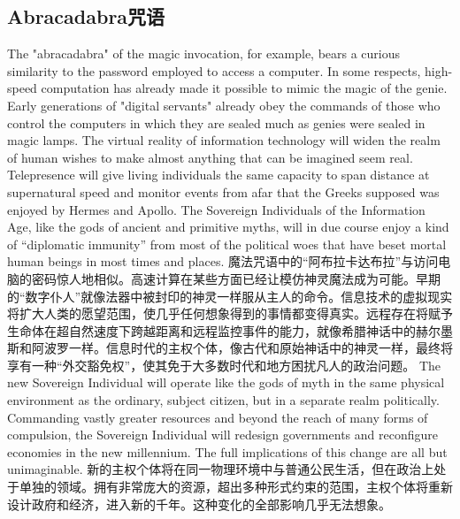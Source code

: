 \subsection{Abracadabra咒语}
\begin{paracol}{2}[]
The "abracadabra" of the magic invocation, for example, bears a curious similarity to the password employed to access a computer. In some respects, high-speed computation has already made it possible to mimic the magic of the genie. Early generations of "digital servants" already obey the commands of those who control the computers in which they are sealed much as genies were sealed in magic lamps. The virtual reality of information technology will widen the realm of human wishes to make almost anything that can be imagined seem real. Telepresence will give living individuals the same capacity to span distance at supernatural speed and monitor events from afar that the Greeks supposed was enjoyed by Hermes and Apollo. The Sovereign Individuals of the Information Age, like the gods of ancient and primitive myths, will in due course enjoy a kind of ``diplomatic immunity'' from most of the political woes that have beset mortal human beings in most times and places.
\switchcolumn
魔法咒语中的“阿布拉卡达布拉”与访问电脑的密码惊人地相似。高速计算在某些方面已经让模仿神灵魔法成为可能。早期的“数字仆人”就像法器中被封印的神灵一样服从主人的命令。信息技术的虚拟现实将扩大人类的愿望范围，使几乎任何想象得到的事情都变得真实。远程存在将赋予生命体在超自然速度下跨越距离和远程监控事件的能力，就像希腊神话中的赫尔墨斯和阿波罗一样。信息时代的主权个体，像古代和原始神话中的神灵一样，最终将享有一种“外交豁免权”，使其免于大多数时代和地方困扰凡人的政治问题。
\switchcolumn*
The new Sovereign Individual will operate like the gods of myth in the same physical environment as the ordinary, subject citizen, but in a separate realm politically. Commanding vastly greater resources and beyond the reach of many forms of compulsion, the Sovereign Individual will redesign governments and reconfigure economies in the new millennium. The full implications of this change are all but unimaginable.
\switchcolumn
新的主权个体将在同一物理环境中与普通公民生活，但在政治上处于单独的领域。拥有非常庞大的资源，超出多种形式约束的范围，主权个体将重新设计政府和经济，进入新的千年。这种变化的全部影响几乎无法想象。
\end{paracol}

